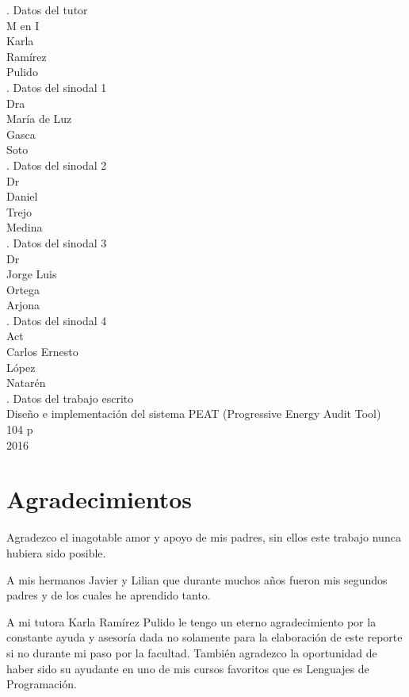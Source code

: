 \documentclass[letterpaper,twoside,openright]{book}
\begin{document}
. Datos del tutor\\
M en I\\
Karla\\
Ramírez\\
Pulido\\

. Datos del sinodal 1\\
Dra\\
María de Luz\\
Gasca\\
Soto\\

. Datos del sinodal 2\\
Dr\\
Daniel\\
Trejo\\
Medina\\

. Datos del sinodal 3\\
Dr\\
Jorge Luis\\
Ortega\\
Arjona\\

. Datos del sinodal 4\\
Act\\
Carlos Ernesto\\
López\\
Natarén\\

. Datos del trabajo escrito\\
Diseño e implementación del sistema PEAT (Progressive Energy Audit Tool)\\
104 p\\
2016\\


\chapter*{Agradecimientos}

Agradezco el inagotable amor y apoyo de mis padres, sin ellos este trabajo
nunca hubiera sido posible.

A mis hermanos Javier y Lilian que durante muchos años fueron mis segundos padres
y de los cuales he aprendido tanto.

A mi tutora Karla Ramírez Pulido le tengo un eterno agradecimiento por la constante
ayuda y asesoría dada no solamente para la elaboración de este reporte si no durante
mi paso por la facultad. También agradezco la oportunidad de haber sido su ayudante
en uno de mis cursos favoritos que es Lenguajes de Programación.
\end{document}
